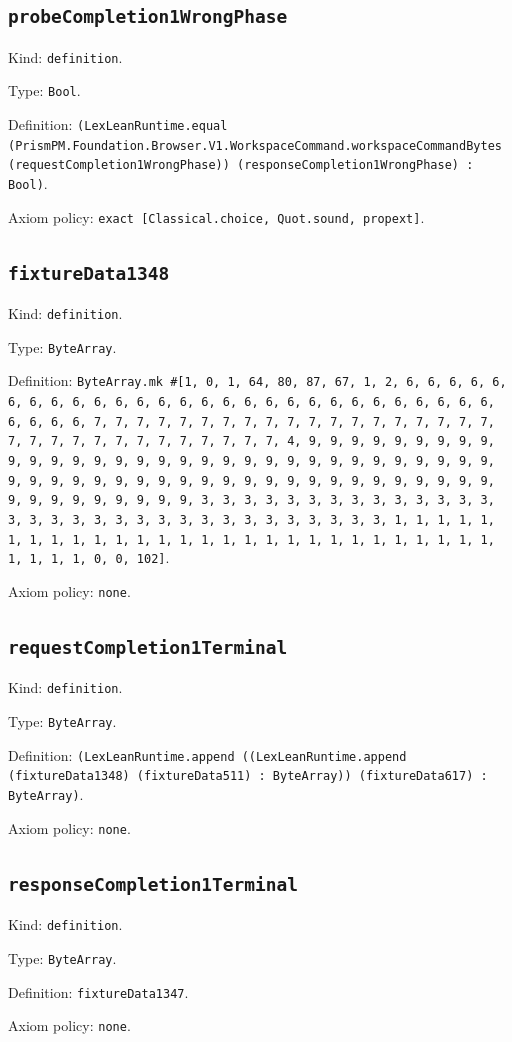 \documentclass[11pt]{article}
\begin{document}
\subsection*{\texttt{probeCompletion1WrongPhase}}
\noindent Kind: \texttt{definition}.\par
\noindent Type: \texttt{Bool}.\par
\noindent Definition: \texttt{(LexLeanRuntime.equal (PrismPM.Foundation.Browser.V1.WorkspaceCommand.workspaceCommandBytes (requestCompletion1WrongPhase)) (responseCompletion1WrongPhase) : Bool)}.\par
\noindent Axiom policy: \texttt{exact [Classical.choice, Quot.sound, propext]}.\par
\subsection*{\texttt{fixtureData1348}}
\noindent Kind: \texttt{definition}.\par
\noindent Type: \texttt{ByteArray}.\par
\noindent Definition: \texttt{ByteArray.mk \#[1, 0, 1, 64, 80, 87, 67, 1, 2, 6, 6, 6, 6, 6, 6, 6, 6, 6, 6, 6, 6, 6, 6, 6, 6, 6, 6, 6, 6, 6, 6, 6, 6, 6, 6, 6, 6, 6, 6, 6, 6, 7, 7, 7, 7, 7, 7, 7, 7, 7, 7, 7, 7, 7, 7, 7, 7, 7, 7, 7, 7, 7, 7, 7, 7, 7, 7, 7, 7, 7, 7, 7, 7, 4, 9, 9, 9, 9, 9, 9, 9, 9, 9, 9, 9, 9, 9, 9, 9, 9, 9, 9, 9, 9, 9, 9, 9, 9, 9, 9, 9, 9, 9, 9, 9, 9, 9, 9, 9, 9, 9, 9, 9, 9, 9, 9, 9, 9, 9, 9, 9, 9, 9, 9, 9, 9, 9, 9, 9, 9, 9, 9, 9, 9, 9, 9, 9, 9, 3, 3, 3, 3, 3, 3, 3, 3, 3, 3, 3, 3, 3, 3, 3, 3, 3, 3, 3, 3, 3, 3, 3, 3, 3, 3, 3, 3, 3, 3, 3, 3, 1, 1, 1, 1, 1, 1, 1, 1, 1, 1, 1, 1, 1, 1, 1, 1, 1, 1, 1, 1, 1, 1, 1, 1, 1, 1, 1, 1, 1, 1, 1, 1, 0, 0, 102]}.\par
\noindent Axiom policy: \texttt{none}.\par
\subsection*{\texttt{requestCompletion1Terminal}}
\noindent Kind: \texttt{definition}.\par
\noindent Type: \texttt{ByteArray}.\par
\noindent Definition: \texttt{(LexLeanRuntime.append ((LexLeanRuntime.append (fixtureData1348) (fixtureData511) : ByteArray)) (fixtureData617) : ByteArray)}.\par
\noindent Axiom policy: \texttt{none}.\par
\subsection*{\texttt{responseCompletion1Terminal}}
\noindent Kind: \texttt{definition}.\par
\noindent Type: \texttt{ByteArray}.\par
\noindent Definition: \texttt{fixtureData1347}.\par
\noindent Axiom policy: \texttt{none}.\par
\end{document}
